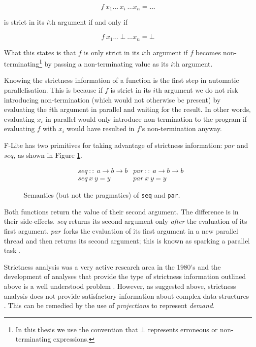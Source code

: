 $$
    f\ x_{1} \dots \ x_{i} \ \dots x_{n} = \dots
$$

\noindent is strict in its $i$th argument if and only if

$$
    f\ x_{1} \dots \ \bot \ \dots x_{n} = \bot
$$

What this states is that $f$ is only strict in its $i$th argument if $f$
becomes non-terminating\footnote{In this thesis we use the convention that
$\bot$ represents erroneous or non-terminating expressions.} by passing a
non-terminating value as its $i$th argument.

Knowing the strictness information of a function is the first step in automatic
parallelisation. This is because if $f$ is strict in its $i$th argument we do
not risk introducing non-termination (which would not otherwise be present) by
evaluating the $i$th argument in parallel and waiting for the result. In other
words, evaluating $x_{i}$ in parallel would only introduce non-termination to
the program if evaluating $f$ with $x_{i}$ would have resulted in $f$'s
non-termination anyway.

F-Lite has two primitives for taking advantage of strictness information: $par$
and $seq$, as shown in Figure \ref{fig:seqandpar}.
\begin{figure}
\figrule
\programmath
\[
\begin{array}{lll}
    &seq \ :: \ a \rightarrow b \rightarrow b &par \ :: \ a \rightarrow b \rightarrow b \\
    &seq \ x \ y = y                          &par \ x \ y = y
\end{array}
\]
\unprogrammath
\caption[Semantics of \texttt{seq} and \texttt{par}.]{Semantics (but not the pragmatics) of \texttt{seq} and \texttt{par}.}
\label{fig:seqandpar}
\end{figure}

Both functions return the value of their second argument. The difference is in
their side-effects. $seq$ returns its second argument only \emph{after}
the evaluation of its first argument. $par$ forks the evaluation of its first
argument in a new parallel thread and then returns its second argument; this is
known as sparking a parallel task \citep{clack1986four}.

Strictness analysis was a very active research area in the 1980's and the
development of analyses that provide the type of strictness information
outlined above is a well understood problem \citep{mycroft1980theory,
clack1985strictness, burn1986strictness}.  However, as suggested above,
strictness analysis does not provide satisfactory information about complex
data-structures \citep{wadler1987strictness}. This can be remedied by the
use of \emph{projections} to represent \emph{demand}.

